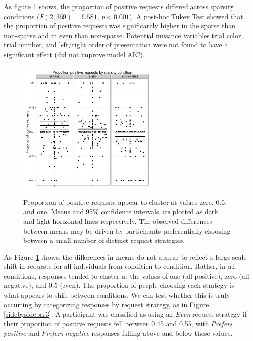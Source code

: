 \documentclass[10pt,letterpaper]{article}
\begin{document}
As figure \ref{propposdots} shows, the proportion of positive requests differed across sparsity conditions ($F(2,359) = 9.581$, $p<0.001$). A post-hoc Tukey Test showed that the proportion of positive requests was significantly higher in the {\sc sparse} than {\sc non-sparse} and in {\sc even} than {\sc non-sparse}. Potential nuisance variables trial color, trial number, and left/right order of presentation were not found to have a significant effect (did not improve model AIC).


\begin{figure}[t]
\centering
\includegraphics[width=.5\textwidth, height=7cm,keepaspectratio]{propposdots2.png}
\caption{Proportion of positive requests appear to cluster at values zero, 0.5, and one. Means and 95\% confidence intervals are plotted as dark and light horizontal lines respectively. The observed differences between means may be driven by participants preferentially choosing between a small number of distinct request strategies.}
\label{propposdots}
\end{figure}

As Figure \ref{propposdots} shows, the differences in means do not appear to reflect a large-scale shift in requests for all individuals from condition to condition. Rather, in all conditions, responses tended to cluster at the values of one (all positive), zero (all negative), and 0.5 (even). The proportion of people choosing each strategy is what appears to shift between conditions. We can test whether this is truly occurring by categorizing responses by request strategy, as in Figure \ref{sidebysidebar3}. A participant was classified as using an \textit{Even} request strategy if their proportion of positive requests fell between 0.45 and 0.55, with \textit{Prefers positive} and \textit{Prefers negative} responses falling above and below these values.
\end{document}
